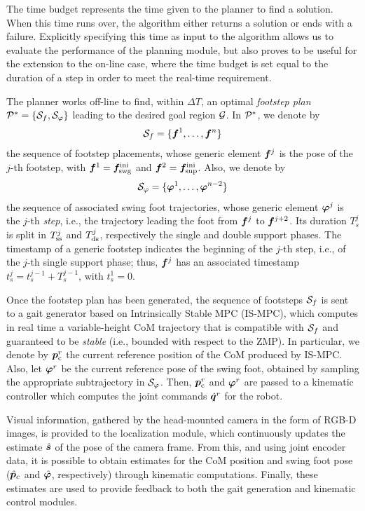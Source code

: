 The time budget represents the time given to the planner to find a solution. When this time runs over, the algorithm either returns a solution or ends with a failure. Explicitly specifying this time as input to the algorithm allows us to evaluate the performance of the planning module, but also proves to be useful for the extension to the on-line case, where the time budget is set equal to the duration of a step in order to meet the real-time requirement.

The planner works off-line to find, within $\Delta T$, an optimal \textit{footstep plan} ${\cal P}^\ast = \{ {\cal S}_f, {\cal S}_\varphi \}$ leading to the desired goal region $\cal G$. In ${\cal P}^*$, we denote by
\begin{equation*}
    {\cal S}_f = \{{\bm{f}}^1, \dots, {\bm{f}}^n\}
\end{equation*}
the sequence of footstep placements, whose generic element ${\bm{f}}^j$ is the pose of the $j$-th footstep, with ${\bm{f}}^1 = {\bm{f}}_{\rm swg}^{\rm ini}$ and ${\bm{f}}^2 = {\bm{f}}_{\rm sup}^{\rm ini}$. Also, we denote by
\begin{equation*}
    {\cal S}_\varphi = \{{\bm{\varphi}}^1, \dots, {\bm{\varphi}}^{n-2}\}
\end{equation*} 
the sequence of associated swing foot trajectories, whose generic element ${\bm{\varphi}}^j$ is the $j$-th {\em step}, i.e., the trajectory leading the foot from ${\bm{f}}^{j}$ to ${\bm{f}}^{j+2}$. Its duration $T_s^j$ is split in $T_{\rm ss}^j$ and $T_{\rm ds}^j$, respectively the single and double support phases. 
The timestamp of a generic footstep indicates the beginning of the $j$-th step, i.e., of the $j$-th single support phase; thus, ${\bm{f}}^{j}$ has an associated timestamp $t_s^{j} = t_s^{j-1} + T_s^{j-1}$, with $t_s^{1}=0$.

Once the footstep plan has been generated, the sequence of footsteps ${\cal S}_{f}$ is sent to a gait generator based on Intrinsically Stable MPC (IS-MPC), which computes in real time a variable-height CoM trajectory that is compatible with ${\cal S}_{f}$ and guaranteed to be {\em stable} (i.e., bounded with respect to the ZMP). In particular, we denote by ${\bm{p}}_{\rm c}^r$ the current reference position of the CoM produced by IS-MPC. Also, let ${\bm{\varphi}}^r$ be the current reference pose of the swing foot, obtained by sampling the appropriate subtrajectory in ${\cal S}_{\varphi}$. Then, ${\bm{p}}_{\rm c}^r$ and ${\bm{\varphi}}^r$ are passed to a kinematic controller which computes the joint commands $\dot{{\bm{q}}}^r$ for the robot.

Visual information, gathered by the head-mounted camera in the form of RGB-D images, is provided to the localization module, which continuously updates the estimate $\hat{{\bm{s}}}$ of the pose of the camera frame.
From this, and using joint encoder data, it is possible to obtain estimates for the CoM position and swing foot pose ($\hat {{\bm{p}}}_c$ and $\hat {{\bm{\varphi}}}$, respectively) through kinematic computations. Finally, these estimates are used to provide feedback to both the gait generation and kinematic control modules.

